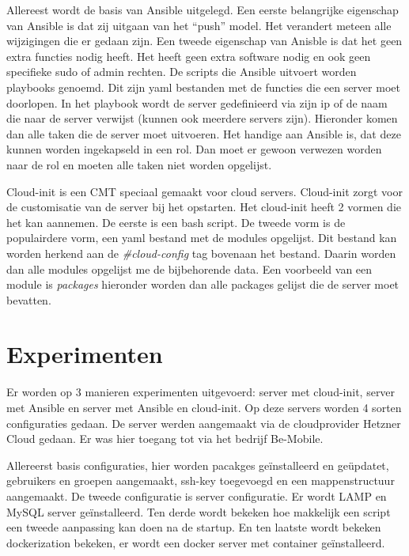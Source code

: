\documentclass[a0,portrait]{a0poster}
\begin{document}
\begin{multicols}{2}
Allereest wordt de basis van Ansible uitgelegd. Een eerste belangrijke eigenschap van Ansible is dat zij uitgaan van het ``push'' model. Het verandert meteen alle wijzigingen die er gedaan zijn. Een tweede eigenschap van Anisble is dat het geen extra functies nodig heeft. Het heeft geen extra software nodig en ook geen specifieke sudo of admin rechten. De scripts die Ansible uitvoert worden playbooks genoemd. Dit zijn yaml bestanden met de functies die een server moet doorlopen. In het playbook wordt de server gedefinieerd via zijn ip of de naam die naar de server verwijst (kunnen ook meerdere servers zijn). Hieronder komen dan alle taken die de server moet uitvoeren. Het handige aan Ansible is, dat deze kunnen worden ingekapseld in een rol. Dan moet er gewoon verwezen worden naar de rol en moeten alle taken niet worden opgelijst. 

Cloud-init is een CMT speciaal gemaakt voor cloud servers. Cloud-init zorgt voor de customisatie van de server bij het opstarten. Het cloud-init heeft 2 vormen die het kan aannemen. De eerste is een bash script. De tweede vorm is de populairdere vorm, een yaml bestand met de modules opgelijst. Dit bestand kan worden herkend aan de \textit{\#cloud-config} tag bovenaan het bestand. Daarin worden dan alle modules opgelijst me de bijbehorende data. Een voorbeeld van een module is \textit{packages} hieronder worden dan alle packages gelijst die de server moet bevatten.


\color{Black} %
\color{HoGentAccent1} 
\section*{Experimenten}
\color{black}
Er worden op 3 manieren experimenten uitgevoerd: server met cloud-init, server met Ansible en server met Ansible en cloud-init. Op deze servers worden 4 sorten configuraties gedaan. De server werden aangemaakt via de cloudprovider Hetzner Cloud gedaan. Er was hier toegang tot via het bedrijf Be-Mobile.

Allereerst basis configuraties, hier worden pacakges geïnstalleerd en geüpdatet, gebruikers en groepen aangemaakt, ssh-key toegevoegd en een mappenstructuur aangemaakt. De tweede configuratie is server configuratie. Er wordt LAMP en MySQL server geïnstalleerd. Ten derde wordt bekeken hoe makkelijk een script een tweede aanpassing kan doen na de startup. En ten laatste wordt bekeken dockerization bekeken, er wordt een docker server met container geïnstalleerd.


\end{multicols}
\end{document}
